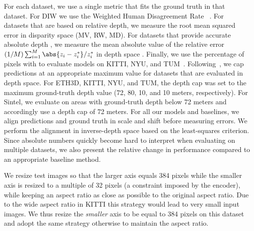 For each dataset, we use a single metric that fits the ground truth in that dataset. For DIW we use the Weighted Human Disagreement Rate ~\cite{Chen2016}.
For datasets that are based on relative depth, we measure the root mean squared error in disparity space (MV, RW, MD). For datasets that provide accurate absolute depth , we measure the mean absolute value of the relative error $(1/M) \sum_{i=1}^M \abs{z_i - z_i^*}/z_i^*$ in depth space .
Finally, we use the percentage of pixels with  to evaluate models on KITTI, NYU, and TUM~\cite{Eigen2014}. Following~\cite{Godard2017}, we cap predictions at an appropriate maximum value for datasets that are evaluated in depth space. For ETH3D, KITTI, NYU, and TUM, the depth cap was set to the maximum ground-truth depth value (72, 80, 10, and 10 meters, respectively). For Sintel, we evaluate on areas with ground-truth depth below 72 meters and accordingly use a depth cap of 72 meters. For all our models and baselines, we align predictions and ground truth in scale and shift  before measuring errors. We perform the alignment in inverse-depth space based on the least-squares criterion. Since absolute numbers quickly become hard to interpret when evaluating on multiple datasets, we also present the relative change in performance compared to an appropriate baseline method.

 We resize test images so that the larger axis equals 384 pixels while the smaller axis is resized to a multiple of 32 pixels  (a constraint imposed by the encoder), while keeping an aspect ratio as close as possible to the original aspect ratio. Due to the wide aspect ratio in KITTI this strategy would lead to very small input images. We thus resize the \textit{smaller} axis to be equal to 384 pixels on this dataset and adopt the same strategy otherwise to maintain the aspect ratio.

